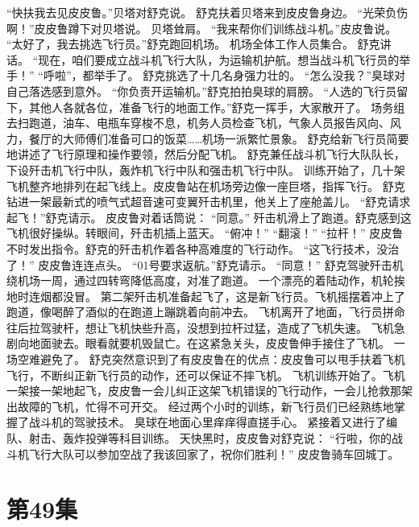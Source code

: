 \documentclass[a4paper,12pt,UTF8,twoside]{ctexbook}
\begin{document}
        “快扶我去见皮皮鲁。”贝塔对舒克说。 
        舒克扶着贝塔来到皮皮鲁身边。 
        “光荣负伤啊！”皮皮鲁蹲下对贝塔说。 
        贝塔耸肩。 
        “我来帮你们训练战斗机。”皮皮鲁说。 
        “太好了，我去挑选飞行员。”舒克跑回机场。 
        机场全体工作人员集合。 
        舒克讲话。 
        “现在，咱们要成立战斗机飞行大队，为运输机护航。想当战斗机飞行员的举手！” 
        “呼啦”，都举手了。 
        舒克挑选了十几名身强力壮的。 
        “怎么没我？”臭球对自己落选感到意外。 
        “你负责开运输机。”舒克拍拍臭球的肩膀。 
        “人选的飞行员留下，其他人各就各位，准备飞行的地面工作。”舒克一挥手，大家散开了。 
        场务组去扫跑道，油车、电瓶车穿梭不息，机务人员检查飞机，气象人员报告风向、风力，餐厅的大师傅们准备可口的饭菜……机场一派繁忙景象。 
        舒克给新飞行员简要地讲述了飞行原理和操作要领，然后分配飞机。 
        舒克兼任战斗机飞行大队队长，下设歼击机飞行中队，轰炸机飞行中队和强击机飞行中队。 
        训练开始了，几十架飞机整齐地排列在起飞线上。皮皮鲁站在机场旁边像一座巨塔，指挥飞行。 
        舒克钻进一架最新式的喷气式超音速可变翼歼击机里，他关上了座舱盖儿。 
        “舒克请求起飞！”舒克请示。 
        皮皮鲁对着话筒说：  “同意。” 
        歼击机滑上了跑道。舒克感到这飞机很好操纵。转眼间，歼击机插上蓝天。 
        “俯冲！” 
        “翻滚！” 
        “拉杆！” 
        皮皮鲁不时发出指令。舒克的歼击机作着各种高难度的飞行动作。 
        “这飞行技术，没治了！” 
        皮皮鲁连连点头。 
        “01号要求返航。”舒克请示。 
        “同意！” 
        舒克驾驶歼击机绕机场一周，通过四转弯降低高度，对准了跑道。 
        一个漂亮的着陆动作，机轮挨地时连烟都没冒。 
        第二架歼击机准备起飞了，这是新飞行员。飞机摇摆着冲上了跑道，像喝醉了酒似的在跑道上蹦跳着向前冲去。 
        飞机离开了地面，飞行员拼命往后拉驾驶杆，想让飞机快些升高，没想到拉杆过猛，造成了飞机失速。 
        飞机急剧向地面驶去。眼看就要机毁鼠亡。在这紧急关头，皮皮鲁伸手接住了飞机。 
        一场空难避免了。 
        舒克突然意识到了有皮皮鲁在的优点：皮皮鲁可以甩手扶着飞机飞行，不断纠正新飞行员的动作，还可以保证不摔飞机。 
        飞机训练开始了。飞机一架接一架地起飞，皮皮鲁一会儿纠正这架飞机错误的飞行动作，一会儿抢救那架出故障的飞机，忙得不可开交。 
        经过两个小时的训练，新飞行员们已经熟练地掌握了战斗机的驾驶技术。 
        臭球在地面心里痒痒得直搓手心。 
        紧接着又进行了编队、射击、轰炸投弹等科目训练。 
        天快黑时，皮皮鲁对舒克说： 
        “行啦，你的战斗机飞行大队可以参加空战了我该回家了，祝你们胜利！” 
        皮皮鲁骑车回城丁。   \chapter{第49集} 
\end{document}
